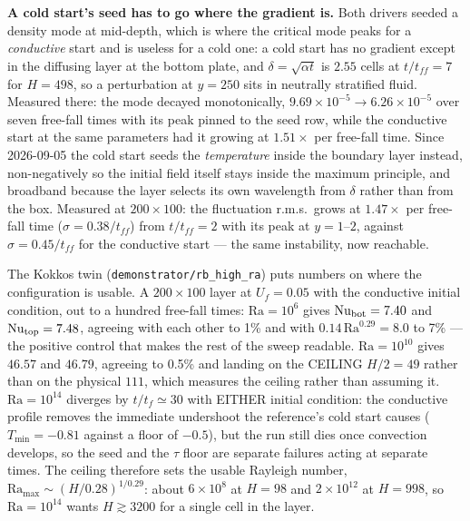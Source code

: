 \documentclass[11pt,a4paper]{article}
\newcommand{\code}[1]{\texttt{\small #1}}
\newcommand{\e}[1]{\times 10^{#1}}
\begin{document}
\begin{enumerate}[leftmargin=1.4em,itemsep=4pt]
  \textbf{A cold start's seed has to go where the gradient is.} Both drivers
  seeded a density mode at mid-depth, which is where the critical mode peaks for
  a \emph{conductive} start and is useless for a cold one: a cold start has no
  gradient except in the diffusing layer at the bottom plate, and
  $\delta=\sqrt{\alpha t}$ is $2.55$ cells at $t/t_{ff}=7$ for $H=498$, so a
  perturbation at $y=250$ sits in neutrally stratified fluid. Measured there:
  the mode decayed monotonically, $9.69\e{-5}\to6.26\e{-5}$ over seven
  free-fall times with its peak pinned to the seed row, while the conductive
  start at the same parameters had it growing at $1.51\times$ per free-fall
  time. Since 2026-09-05 the cold start seeds the \emph{temperature} inside the
  boundary layer instead, non-negatively so the initial field itself stays
  inside the maximum principle, and broadband because the layer selects its own
  wavelength from $\delta$ rather than from the box. Measured at $200\times100$:
  the fluctuation r.m.s.\ grows at $1.47\times$ per free-fall time
  ($\sigma=0.38/t_{ff}$) from $t/t_{ff}=2$ with its peak at $y=1$--$2$, against
  $\sigma=0.45/t_{ff}$ for the conductive start --- the same instability, now
  reachable.

  The Kokkos twin (\code{demonstrator/rb\_high\_ra}) puts numbers on where the
  configuration is usable. A $200\times100$ layer at $U_f=0.05$ with the
  conductive initial condition, out to a hundred free-fall times:
  $\mathrm{Ra}=10^{6}$ gives $\mathrm{Nu}_{\rm bot}=7.40$ and
  $\mathrm{Nu}_{\rm top}=7.48$, agreeing with each other to 1\% and with
  $0.14\,\mathrm{Ra}^{0.29}=8.0$ to 7\% --- the positive control that makes the
  rest of the sweep readable. $\mathrm{Ra}=10^{10}$ gives $46.57$ and $46.79$,
  agreeing to 0.5\% and landing on the CEILING $H/2=49$ rather than on the
  physical $111$, which measures the ceiling rather than assuming it.
  $\mathrm{Ra}=10^{14}$ diverges by $t/t_f\simeq30$ with EITHER initial
  condition: the conductive profile removes the immediate undershoot the
  reference's cold start causes ($T_{\min}=-0.81$ against a floor of $-0.5$),
  but the run still dies once convection develops, so the seed and the $\tau$
  floor are separate failures acting at separate times. The ceiling therefore
  sets the usable Rayleigh number, $\mathrm{Ra}_{\max}\sim(H/0.28)^{1/0.29}$:
  about $6\e{8}$ at $H=98$ and $2\e{12}$ at $H=998$, so $\mathrm{Ra}=10^{14}$
  wants $H\gtrsim3200$ for a single cell in the layer.


\end{enumerate}
\end{document}
